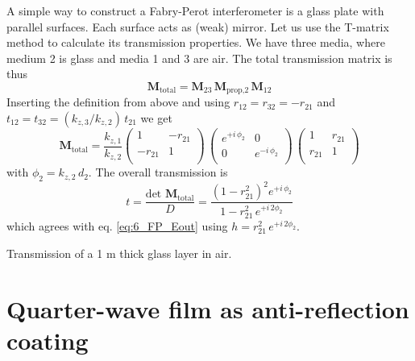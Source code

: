 A simple way to construct a Fabry-Perot interferometer is a glass plate with parallel surfaces. Each surface acts as (weak) mirror. Let us use the T-matrix method to calculate its transmission properties. We have three media, where medium 2 is glass and media 1 and 3 are air. The total transmission matrix is thus
\begin{equation}
  \mathbf{M}_\text{total}  = \mathbf{M}_{23} \, \mathbf{M}_\text{prop,2} \, \mathbf{M}_{12}  
\end{equation}
Inserting the definition from above and using $r_{12} = r_{32} = - r_{21}$ and $t_{12} = t_{32} = (k_{z,3} / k_{z,2}) \, t_{21}$ we get
\begin{equation}
  \mathbf{M}_\text{total}
  = 
  \frac{k_{z,1}}{k_{z,2}} 
  \begin{pmatrix}
  1 & -r_{21} \\ -r_{21} & 1 \\
  \end{pmatrix} 
\, 
\begin{pmatrix}
  e^{+i \, \phi_2 } & 0 \\0 & e^{-i \, \phi_2 } \\
  \end{pmatrix}
\,
\begin{pmatrix}
1 & r_{21} \\ r_{21} & 1 \\
\end{pmatrix} 
\end{equation}
with $\phi_2 = k_{z,2} \, d_2$. The overall transmission is 
\begin{equation}
  t = \frac{\text{det } \mathbf{M}_\text{total} }{D} = 
  \frac{(1 - r_{21}^2)^2   e^{+ i \, \phi_2}} {  1 - r_{21}^2 \, e^{+i \,2 \phi_2 }}
  \end{equation}
which agrees with eq. \ref{eq:6_FP_Eout} using $h = r_{21}^2 \, e^{+i \,2 \phi_2 }$.

\begin{marginfigure}
  \caption{Transmission of a 1 \textmu m  thick glass layer in air. }
\end{marginfigure}

\section{Quarter-wave film as anti-reflection coating}

